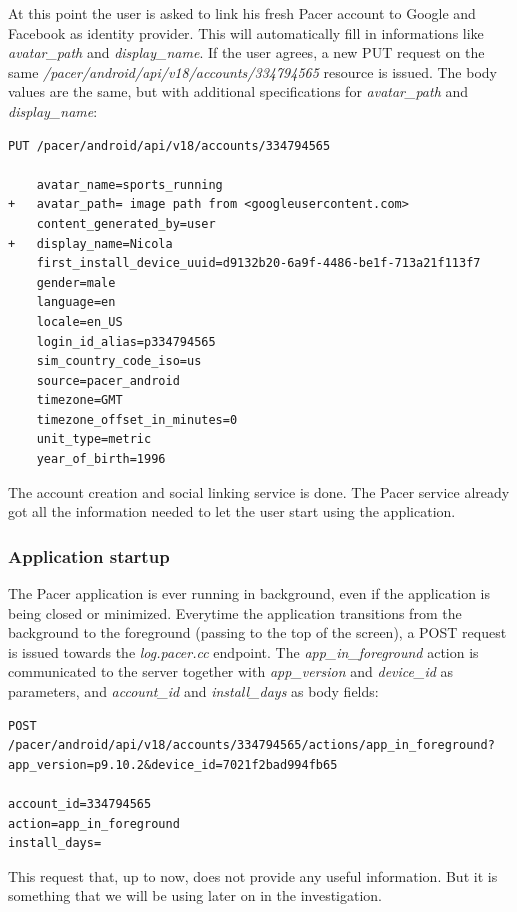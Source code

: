 			\par At this point the user is asked to link his fresh Pacer account to Google and Facebook as identity provider. This will automatically fill in informations like \textit{avatar\_path} and \textit{display\_name}. If the user agrees, a new PUT request on the same \textit{/pacer/android/api/v18/accounts/334794565} resource is issued. The body values are the same, but with additional specifications for \textit{avatar\_path} and \textit{display\_name}:
\begin{lstlisting}
PUT /pacer/android/api/v18/accounts/334794565

	avatar_name=sports_running
+	avatar_path= image path from <googleusercontent.com>
	content_generated_by=user
+	display_name=Nicola
	first_install_device_uuid=d9132b20-6a9f-4486-be1f-713a21f113f7
	gender=male
	language=en
	locale=en_US
	login_id_alias=p334794565
	sim_country_code_iso=us
	source=pacer_android
	timezone=GMT
	timezone_offset_in_minutes=0
	unit_type=metric
	year_of_birth=1996
\end{lstlisting}
			\par The account creation and social linking service is done. The Pacer service already got all the information needed to let the user start using the application.
	
		\subsubsection{Application startup}
		\par The Pacer application is ever running in background, even if the application is being closed or minimized. Everytime the application transitions from the background to the foreground (passing to the top of the screen), a POST request is issued towards the \textit{log.pacer.cc} endpoint. The \textit{app\_in\_foreground} action is communicated to the server together with \textit{app\_version} and \textit{device\_id} as parameters, and \textit{account\_id} and \textit{install\_days} as body fields:
\begin{lstlisting}
POST /pacer/android/api/v18/accounts/334794565/actions/app_in_foreground?app_version=p9.10.2&device_id=7021f2bad994fb65

account_id=334794565
action=app_in_foreground
install_days=
\end{lstlisting}
		\par This request that, up to now, does not provide any useful information. But it is something that we will be using later on in the investigation.
		
